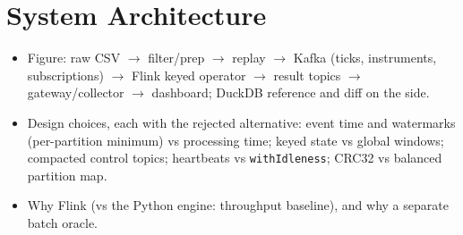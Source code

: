 \section{System Architecture}
\label{sec:architecture}

\begin{itemize}
  \item Figure: raw CSV $\rightarrow$ filter/prep $\rightarrow$ replay $\rightarrow$ Kafka (ticks, instruments, subscriptions) $\rightarrow$ Flink keyed operator $\rightarrow$ result topics $\rightarrow$ gateway/collector $\rightarrow$ dashboard; DuckDB reference and diff on the side.
  \item Design choices, each with the rejected alternative: event time and watermarks (per-partition minimum) vs processing time; keyed state vs global windows; compacted control topics; heartbeats vs \texttt{withIdleness}; CRC32 vs balanced partition map.
  \item Why Flink (vs the Python engine: throughput baseline), and why a separate batch oracle.
\end{itemize}
